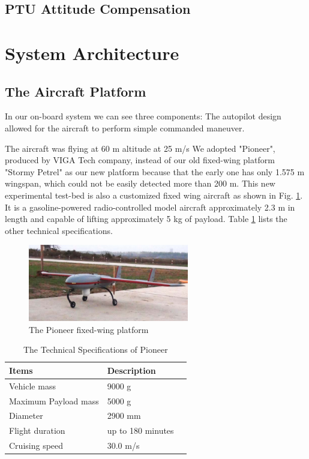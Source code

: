 \subsection{PTU Attitude Compensation}


\section{System Architecture}
\subsection{The Aircraft Platform}
In our on-board system we can see three components:
The autopilot design allowed for the aircraft to perform simple commanded maneuver.

The aircraft was flying at 60 m altitude at 25 m/s 
We adopted "Pioneer", produced by VIGA Tech company, instead of our old fixed-wing platform "Stormy Petrel" as our new platform because that the early one has only 1.575 m wingspan, which could not be easily detected more than 200 m. This new experimental test-bed is also a customized fixed wing aircraft as shown in Fig. \ref{fig:Kaitudozhe_VIGA}. It is a gasoline-powered radio-controlled model aircraft approximately 2.3 m in length and capable of lifting approximately 5 kg of payload. Table \ref{tab:platform_specifications} lists the other technical specifications.

\begin{figure}[!tb]
	\centering
	\includegraphics[width=7cm]{Figs/Kaituozhe_Our.pdf}
	\caption{The Pioneer fixed-wing platform}
	\label{fig:Kaitudozhe_VIGA}    
\end{figure}


\begin{table}
	\caption{The Technical Specifications of Pioneer}
	\label{tab:platform_specifications}
	\begin{center}
		\renewcommand{\arraystretch}{1.1}
		\begin{tabular}{lll}
			\hline
			\textbf {Items}  & \textbf{Description} \\
			\hline
			Vehicle mass & 9000 g \\
			Maximum Payload mass & 5000 g \\
			Diameter & 2900 mm \\
			Flight duration & up to 180 minutes \\
			Cruising speed & 30.0 m/s \\
			\hline
		\end{tabular}
	\end{center}
\end{table}


